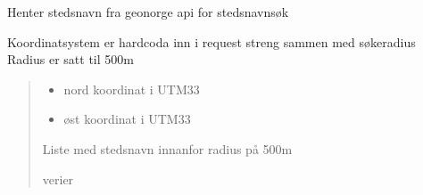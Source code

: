 \documentclass[letterpaper,10pt,norsk]{sphinxmanual}
\begin{document}

\begin{fulllineitems}
\label{\detokenize{index:klimadata.klimadata.stedsnavn}}
\pysigstartsignatures
{}
\pysigstopsignatures
\sphinxAtStartPar
Henter stedsnavn fra geonorge api for stedsnavnsøk

\sphinxAtStartPar
Koordinatsystem er hardcoda inn i request streng sammen med søkeradius
Radius er satt til 500m
\begin{quote}\begin{description}
\begin{itemize}
\item {} 
\sphinxAtStartPar
{} \textendash{} nord koordinat i UTM33

\item {} 
\sphinxAtStartPar
{} \textendash{} øst koordinat i UTM33

\end{itemize}

\sphinxAtStartPar
Liste med stedsnavn innanfor radius på 500m

\sphinxAtStartPar
verier

\end{description}\end{quote}

\end{fulllineitems}

\end{document}
